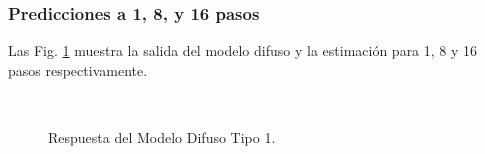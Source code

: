 \documentclass[12pt]{article}
\begin{document}
\subsubsection{Predicciones a 1, 8, y 16
pasos}

Las Fig. \ref{f_SalidaModelo} muestra la salida del modelo difuso y  la estimación para 1, 8 y 16 pasos respectivamente.

\begin{figure}
		\centering
		\captionsetup{justification=centering}
        \\
		\caption{Respuesta del Modelo Difuso Tipo 1.}
		\label{f_SalidaModelo}
\end{figure}
\end{document}

